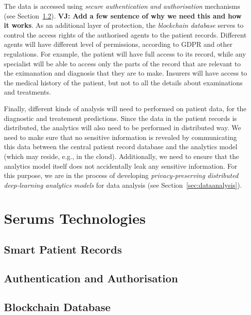 The data is accessed using \emph{secure authentication and authorisation} mechanisms (see Section~\ref{sec:authentication}). \textbf{VJ: Add a few sentence of why we need this and how it works}. As an additional layer of protection, the \emph{blockchain database} serves to control the access rights of the authorised agents to the patient records. Different agents will have different level of permissions, according to GDPR and other regulations. For example, the patient will have full access to its record, while any specialist will be able to access only the parts of the record that are relevant to the eximanation and diagnosis that they are to make. Insurers will have access to the medical history of the patient, but not to all the details about examinations and treatments.

Finally, different kinds of analysis will need to performed on patient data, for the diagnostic and treatement predictions. Since the data in the patient records is distributed, the analytics will also need to be performed in distributed way. We need to make sure that no sensitive information is revealed by communicating this data between the central patient record database and the analytics model (which may reside, e.g., in the cloud). Additionally, we need to ensure that the analytics model itself does not accidentally leak any sensitive information. For this purpose, we are in the process of developing \emph{privacy-preserving distributed deep-learning analytics models} for data analysis (see Section~\ref{sec:dataanalysis}).

\section{Serums Technologies}

\subsection{Smart Patient Records}
\label{sec:smartrecords}

\subsection{Authentication and Authorisation}
\label{sec:authentication}

\subsection{Blockchain Database}
\label{sec:blockchain}

